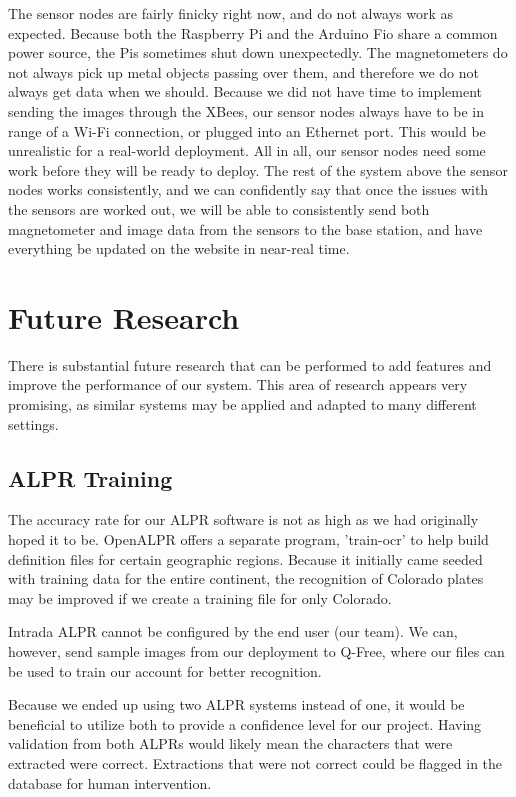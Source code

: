 \documentclass[11pt, oneside, fullpage, doublespace]{article}
\begin{document}
The sensor nodes are fairly finicky right now, and do not always work as expected. Because both the Raspberry Pi and the Arduino Fio share a common power source, the Pis sometimes shut down unexpectedly. The magnetometers do not always pick up metal objects passing over them, and therefore we do not always get data when we should. Because we did not have time to implement sending the images through the XBees, our sensor nodes always have to be in range of a Wi-Fi connection, or plugged into an Ethernet port. This would be unrealistic for a real-world deployment. All in all, our sensor nodes need some work before they will be ready to deploy. The rest of the system above the sensor nodes works consistently, and we can confidently say that once the issues with the sensors are worked out, we will be able to consistently send both magnetometer and image data from the sensors to the base station, and have everything be updated on the website in near-real time.

\section{Future Research}
There is substantial future research that can be performed to add features and improve the performance of our system. This area of research appears very promising, as similar systems may be applied and adapted to many different settings.

\subsection{ALPR Training}
The accuracy rate for our ALPR software is not as high as we had originally hoped it to be. OpenALPR offers a separate program, 'train-ocr' to help build definition files for certain geographic regions. Because it initially came seeded with training data for the entire continent, the recognition of Colorado plates may be improved if we create a training file for only Colorado.

Intrada ALPR cannot be configured by the end user (our team). We can, however, send sample images from our deployment to Q-Free, where our files can be used to train our account for better recognition.

Because we ended up using two ALPR systems instead of one, it would be beneficial to utilize both to provide a confidence level for our project. Having validation from both ALPRs would likely mean the characters that were extracted were correct. Extractions that were not correct could be flagged in the database for human intervention.
\end{document}
